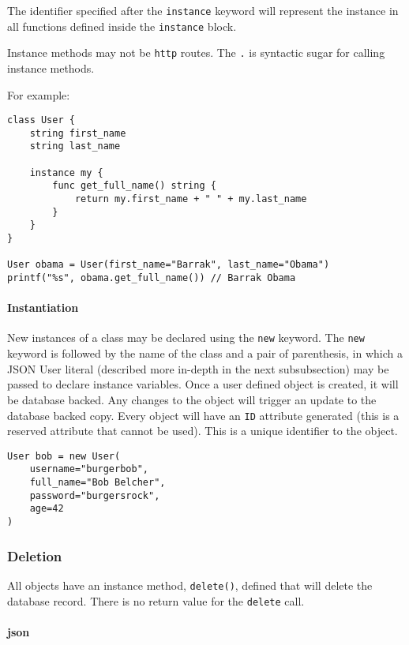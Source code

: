 The identifier specified after the \texttt{instance} keyword will
represent the instance in all functions defined inside the
\texttt{instance} block.

Instance methods may not be \texttt{http} routes. The \texttt{.} is
syntactic sugar for calling instance methods.

For example:

\begin{verbatim}
class User {
    string first_name
    string last_name

    instance my {
        func get_full_name() string {
            return my.first_name + " " + my.last_name
        }
    }
}

User obama = User(first_name="Barrak", last_name="Obama")
printf("%s", obama.get_full_name()) // Barrak Obama
\end{verbatim}

\paragraph{Instantiation}\label{instantiation}

New instances of a class may be declared using the \texttt{new} keyword.
The \texttt{new} keyword is followed by the name of the class and a pair
of parenthesis, in which a JSON User literal (described more in-depth in
the next subsubsection) may be passed to declare instance variables. Once a
user defined object is created, it will be database backed. Any changes
to the object will trigger an update to the database backed copy. Every
object will have an \texttt{ID} attribute generated (this is a reserved
attribute that cannot be used). This is a unique identifier to the
object.

\begin{verbatim}
User bob = new User(
    username="burgerbob",
    full_name="Bob Belcher",
    password="burgersrock",
    age=42
)
\end{verbatim}

\subsubsection{Deletion}\label{deletion}

All objects have an instance method, \texttt{delete()}, defined that
will delete the database record. There is no return value for the
\texttt{delete} call.

\paragraph{json}\label{json-1}

